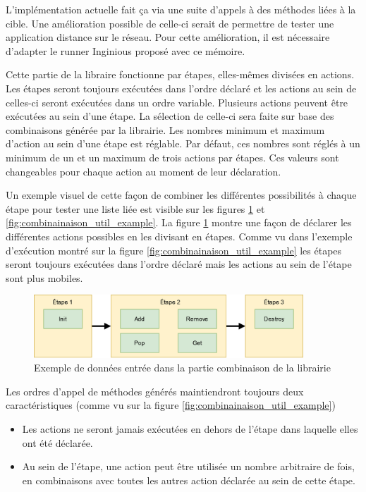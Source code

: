 \documentclass[a4paper]{report}
\begin{document}
L'implémentation actuelle fait ça via une suite d'appels à des méthodes liées à la cible.
Une amélioration possible de celle-ci serait de permettre de tester une application distance sur le réseau.
Pour cette amélioration, il est nécessaire d'adapter le runner Inginious proposé avec ce mémoire.

Cette partie de la libraire fonctionne par étapes, elles-mêmes divisées en actions.
Les étapes seront toujours exécutées dans l'ordre déclaré et les actions au sein de celles-ci seront exécutées dans un ordre variable.
Plusieurs actions peuvent être exécutées au sein d'une étape.
La sélection de celle-ci sera faite sur base des combinaisons générée par la librairie.
Les nombres minimum et maximum d'action au sein d'une étape est réglable.
Par défaut, ces nombres sont réglés à un minimum de un et un maximum de trois actions par étapes.
Ces valeurs sont changeables pour chaque action au moment de leur déclaration.

Un exemple visuel de cette façon de combiner les différentes possibilités à chaque étape pour tester une liste liée est visible sur les figures \ref{fig:combinainaison_decl_example} et \ref{fig:combinainaison_util_example}.
La figure \ref{fig:combinainaison_decl_example} montre une façon de déclarer les différentes actions possibles en les divisant en étapes.
Comme vu dans l'exemple d'exécution montré sur la figure \ref{fig:combinainaison_util_example} les étapes seront toujours exécutées dans l'ordre déclaré mais les actions au sein de l'étape sont plus mobiles.

\begin{figure}[ht]
	\begin{center}
		\includegraphics[width=0.9\textwidth]{img/combinator_steps_decl.png} 
	\end{center}
	\caption{Exemple de données entrée dans la partie combinaison de la librairie}
	\label{fig:combinainaison_decl_example}
\end{figure}

Les ordres d'appel de méthodes générés maintiendront toujours deux caractéristiques (comme vu sur la figure \ref{fig:combinainaison_util_example})
\begin{itemize}
\item Les actions ne seront jamais exécutées en dehors de l'étape dans laquelle elles ont été déclarée.
\item Au sein de l'étape, une action peut être utilisée un nombre arbitraire de fois, en combinaisons avec toutes les autres action déclarée au sein de cette étape.
\end{itemize}
\end{document}
